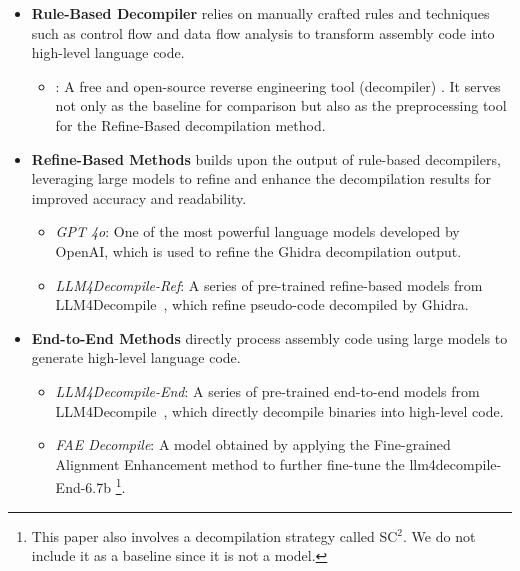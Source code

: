 
\begin{itemize}
    \item \textbf{Rule-Based Decompiler} relies on manually crafted rules and techniques such as control flow and data flow analysis to transform assembly code into high-level language code. 
    \begin{itemize}
    \item \textit{\ghidra{}}: A free and open-source reverse engineering tool (decompiler)
    \citep{ghidra}. It serves not only as the baseline for comparison but also as the preprocessing tool for the Refine-Based decompilation method.
    \end{itemize}
    \item \textbf{Refine-Based Methods} builds upon the output of rule-based decompilers, leveraging large models to refine and enhance the decompilation results for improved accuracy and readability.
    \begin{itemize}
    \item \textit{GPT 4o}: One of the most powerful language models developed by OpenAI, which is used to refine the Ghidra decompilation output.
    \item \textit{LLM4Decompile-Ref}: A series of pre-trained refine-based models from LLM4Decompile~\citep{llm4decompile}, which refine pseudo-code decompiled by Ghidra.
    \end{itemize}
    \item \textbf{End-to-End Methods} directly process assembly code using large models to generate high-level language code.
    \begin{itemize} 
    \item \textit{LLM4Decompile-End}: A series of pre-trained end-to-end models from LLM4Decompile~\citep{llm4decompile}, which directly decompile binaries into high-level code.
    \item \textit{FAE Decompile}: A model obtained by applying the Fine-grained Alignment Enhancement method to further fine-tune the llm4decompile-End-6.7b \citep{feng2024self}\footnote{This paper also involves a decompilation strategy called SC$^2$. We do not include it as a baseline since it is not a model.}.
    

\end{itemize}
\end{itemize}
